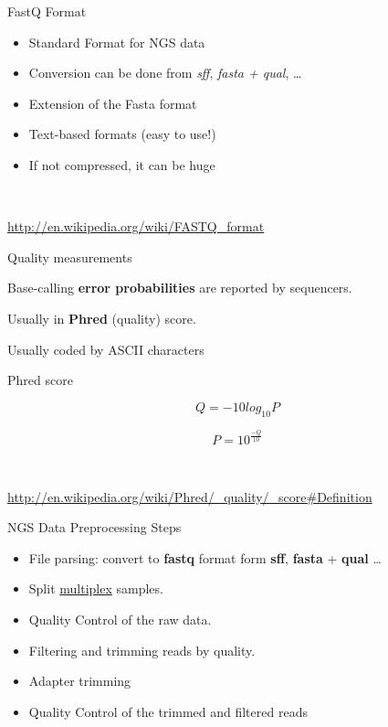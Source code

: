 \begin{frame}{FastQ Format}

\begin{itemize}
\itemsep1pt\parskip0pt
\item
  Standard Format for NGS data
\item
  Conversion can be done from \emph{sff}, \emph{fasta + qual}, \ldots{}
\item
  Extension of the Fasta format
\item
  Text-based formats (easy to use!)
\item
  If not compressed, it can be huge
\end{itemize}

~

\centering

\url{http://en.wikipedia.org/wiki/FASTQ_format}

\end{frame}

\begin{frame}{Quality measurements}

Base-calling \textbf{error probabilities} are reported by sequencers.

Usually in \textbf{Phred} (quality) score.

Usually coded by ASCII characters

\begin{block}{Phred score}

\[Q = -10 log_{10} P\]

\[P = 10^{\frac{-Q}{10}}\]

~

\url{http://en.wikipedia.org/wiki/Phred/_quality/_score\#Definition}

\end{block}

\end{frame}

\begin{frame}{NGS Data Preprocessing Steps}

\begin{itemize}
\item
  File parsing: convert to \textbf{fastq} format form \textbf{sff},
  \textbf{fasta} + \textbf{qual} \ldots{}
\item
  Split
  \href{http://www.illumina.com/technology/multiplexing_sequencing_assay.ilmn}{multiplex}
  samples.
\item
  Quality Control of the raw data.
\item
  Filtering and trimming reads by quality.
\item
  Adapter trimming
\item
  Quality Control of the trimmed and filtered reads
\end{itemize}

\end{frame}


